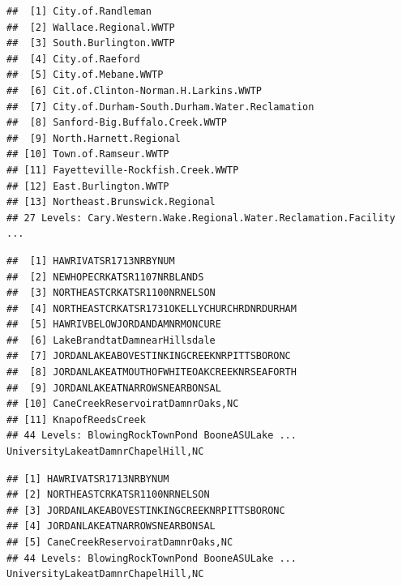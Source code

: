 \documentclass[
  12pt,
]{article}
\begin{document}
\begin{verbatim}
##  [1] City.of.Randleman                            
##  [2] Wallace.Regional.WWTP                        
##  [3] South.Burlington.WWTP                        
##  [4] City.of.Raeford                              
##  [5] City.of.Mebane.WWTP                          
##  [6] Cit.of.Clinton-Norman.H.Larkins.WWTP         
##  [7] City.of.Durham-South.Durham.Water.Reclamation
##  [8] Sanford-Big.Buffalo.Creek.WWTP               
##  [9] North.Harnett.Regional                       
## [10] Town.of.Ramseur.WWTP                         
## [11] Fayetteville-Rockfish.Creek.WWTP             
## [12] East.Burlington.WWTP                         
## [13] Northeast.Brunswick.Regional                 
## 27 Levels: Cary.Western.Wake.Regional.Water.Reclamation.Facility ...
\end{verbatim}

\begin{verbatim}
##  [1] HAWRIVATSR1713NRBYNUM                     
##  [2] NEWHOPECRKATSR1107NRBLANDS                
##  [3] NORTHEASTCRKATSR1100NRNELSON              
##  [4] NORTHEASTCRKATSR1731OKELLYCHURCHRDNRDURHAM
##  [5] HAWRIVBELOWJORDANDAMNRMONCURE             
##  [6] LakeBrandtatDamnearHillsdale              
##  [7] JORDANLAKEABOVESTINKINGCREEKNRPITTSBORONC 
##  [8] JORDANLAKEATMOUTHOFWHITEOAKCREEKNRSEAFORTH
##  [9] JORDANLAKEATNARROWSNEARBONSAL             
## [10] CaneCreekReservoiratDamnrOaks,NC          
## [11] KnapofReedsCreek                          
## 44 Levels: BlowingRockTownPond BooneASULake ... UniversityLakeatDamnrChapelHill,NC
\end{verbatim}

\begin{verbatim}
## [1] HAWRIVATSR1713NRBYNUM                    
## [2] NORTHEASTCRKATSR1100NRNELSON             
## [3] JORDANLAKEABOVESTINKINGCREEKNRPITTSBORONC
## [4] JORDANLAKEATNARROWSNEARBONSAL            
## [5] CaneCreekReservoiratDamnrOaks,NC         
## 44 Levels: BlowingRockTownPond BooneASULake ... UniversityLakeatDamnrChapelHill,NC
\end{verbatim}
\end{document}
